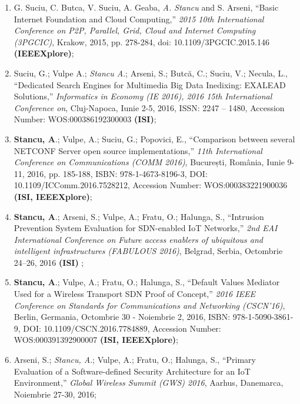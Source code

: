 \begin{enumerate}
	\item G. Suciu, C. Butca, V. Suciu, A. Geaba, \textit{A. Stancu} and S. Arseni, ``Basic Internet Foundation and Cloud Computing,'' \textit{2015 10th International Conference on P2P, Parallel, Grid, Cloud and Internet Computing (3PGCIC)}, Krakow, 2015, pp. 278-284, doi: 10.1109/3PGCIC.2015.146 \textbf{(IEEEXplore)};
	
	\item Suciu, G.; Vulpe A.; \textit{Stancu A}.; Arseni, S.; Butcă, C.; Suciu, V.; Necula, L., ``Dedicated Search Engines for Multimedia Big Data Inedixing: EXALEAD Solutions,'' \textit{Informatics in Economy (IE 2016), 2016 15th International Conference on}, Cluj-Napoca, Iunie 2-5, 2016, ISSN: 2247 – 1480,  Accession Number: WOS:000386192300003 \textbf{(ISI)};
	
	\item \textbf{Stancu, A}.; Vulpe, A.; Suciu, G.; Popovici, E., ``Comparison between several NETCONF Server open source implementations,'' \textit{11th International Conference on Communications (COMM 2016)}, București, România, Iunie 9-11, 2016, pp. 185-188, ISBN: 978-1-4673-8196-3, DOI: 10.1109/ICComm.2016.7528212, Accession Number: WOS:000383221900036 \textbf{(ISI, IEEEXplore)}\label{item:comparison_netconf};
	
	\item \textbf{Stancu, A}.; Arseni, S.; Vulpe, A.; Fratu, O.; Halunga, S., ``Intrusion Prevention System Evaluation for SDN-enabled IoT Networks,'' \textit{2nd EAI International Conference on Future access enablers of ubiquitous and intelligent infrastructures (FABULOUS 2016)}, Belgrad, Serbia, Octombrie 24–26, 2016 \textbf{(ISI)} \label{item:ips_iot};
	
	\item \textbf{Stancu, A}.; Vulpe, A.; Fratu, O.; Halunga, S., ``Default Values Mediator Used for a Wireless Transport SDN Proof of Concept,'' \textit{2016 IEEE Conference on Standards for Communications and Networking (CSCN'16)}, Berlin, Germania, Octombrie 30 - Noiembrie 2, 2016, ISBN: 978-1-5090-3861-9, DOI: 10.1109/CSCN.2016.7784889, Accession Number: WOS:000391392900007 \textbf{(ISI, IEEEXplore)}\label{item:dvm_v01};
	
	\item Arseni, S.; \textit{Stancu, A}.; Vulpe, A.; Fratu, O.; Halunga, S., ``Primary Evaluation of a Software-defined Security Architecture for an IoT Environment,'' \textit{Global Wireless Summit (GWS) 2016}, Aarhus, Danemarca, Noiembrie 27-30, 2016;
	

\end{enumerate}
